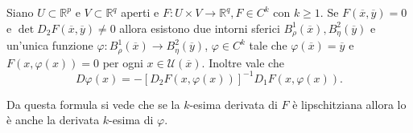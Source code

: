 \begin{teorema}
Siano $U\subset\mathbb{R}^{p}$ e $V\subset\mathbb{R}^{q}$ aperti e $F:U\times V\rightarrow\mathbb{R}^{q}, F\in C^{k}$ con $k\geq 1$. Se $F(\overline{x},\overline{y})=0$ e $\det D_{2}F(\overline{x},\overline{y})\neq 0$ allora esistono due intorni sferici $B_{\rho}^{1}(\overline{x}), B_{\eta}^{2}(\overline{y})$ e un'unica funzione $\varphi: B_{\rho}^{1}(\overline{x}) \longrightarrow B_{\eta}^{2}(\overline{y})$, $\varphi\in C^{k}$ tale che $\varphi(\overline{x})=\overline{y}$ e $F(x,\varphi(x))=0$ per ogni $x\in\mathcal{U}(\overline{x})$. Inoltre vale che
\begin{equation}
D\varphi(x)=-[D_{2}F(x,\varphi(x))]^{-1}D_{1}F(x,\varphi(x)).
\end{equation}
\end{teorema}
Da questa formula si vede che se la $k$-esima derivata di $F$ è lipschitziana allora lo è anche la derivata $k$-esima di $\varphi$.
